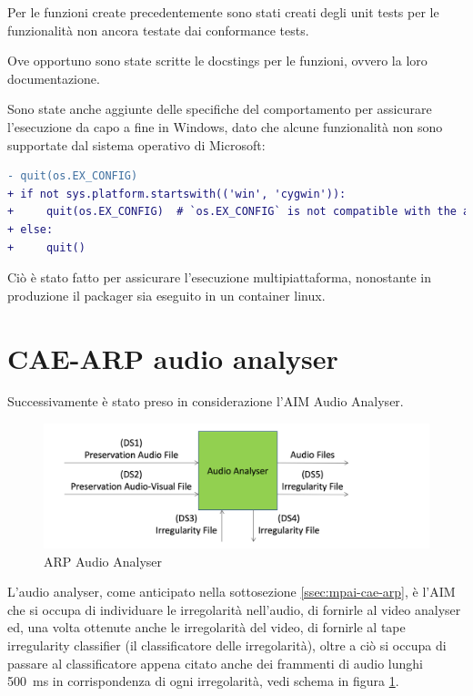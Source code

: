 Per le funzioni create precedentemente sono stati creati degli unit tests per le funzionalità non ancora testate dai conformance tests.

Ove opportuno sono state scritte le docstings per le funzioni, ovvero la loro documentazione.

Sono state anche aggiunte delle specifiche del comportamento per assicurare l'esecuzione da capo a fine in Windows, dato che alcune funzionalità non sono supportate dal sistema operativo di Microsoft:
\begin{lstlisting}[language=diff]
- quit(os.EX_CONFIG)
+ if not sys.platform.startswith(('win', 'cygwin')):
+     quit(os.EX_CONFIG)  # `os.EX_CONFIG` is not compatible with the above platforms in Python 3.10
+ else:
+     quit()
\end{lstlisting}
Ciò è stato fatto per assicurare l'esecuzione multipiattaforma, nonostante in produzione il packager sia eseguito in un container linux.


\section{\acs{CAE}-\acs{ARP} audio analyser} \label{sec:test-audioanalyser}
Successivamente è stato preso in considerazione l'\ac{AIM} Audio Analyser.

\begin{figure}
    \centering
    \includegraphics{img/audioanalyser.png}
    \caption{\ac{ARP} Audio Analyser}
    \label{fig:audio-analyser}
\end{figure}

L'audio analyser, come anticipato nella sottosezione \ref{ssec:mpai-cae-arp}, è l'\ac{AIM} che si occupa di individuare le irregolarità nell'audio, di fornirle al video analyser ed, una volta ottenute anche le irregolarità del video, di fornirle al tape irregularity classifier (il classificatore delle irregolarità), oltre a ciò si occupa di passare al classificatore appena citato anche dei frammenti di audio lunghi \qty{500}{\ms} in corrispondenza di ogni irregolarità, vedi schema in figura \ref{fig:audio-analyser}.

